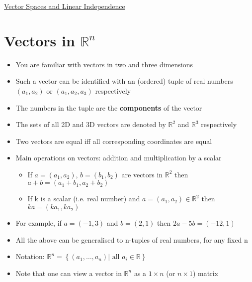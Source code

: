 \documentclass{article}[18pt]
\begin{document}
\begin{center}
\underline{\huge Vector Spaces and Linear Independence}
\end{center}
\section{Vectors in $\mathbb{R}^n$}
\begin{itemize}
	\item You are familiar with vectors in two and three dimensions
	\item Such a vector can be identified with an (ordered) tuple of real numbers $(a_1,a_2)$ or $(a_1,a_2,a_3)$ respectively
	\item The numbers in the tuple are the \textbf{components} of the vector
	\item The sets of all 2D and 3D vectors are denoted by $\mathbb{R}^2$ and $\mathbb{R}^3$ respectively
	\item Two vectors are equal iff all corresponding coordinates are equal 
	\item Main operations on vectors: addition and multiplication by a scalar
	\begin{itemize}
		\item If $a=(a_1,a_2)$, $b=(b_1,b_2)$ are vectors in $\mathbb{R}^2$ then $a+b=(a_1+b_1,a_2+b_2)$
		\item If k is a scalar (i.e. real number) and $a=(a_1,a_2)\in \mathbb{R}^2$ then $ka=(ka_1,ka_2)$
	\end{itemize}
	\item For example, if $a=(-1,3)$ and $b=(2,1)$ then $2a-5b=(-12,1)$
	\item All the above can be generalised to n-tuples of real numbers, for any fixed n
	\item Notation: $\mathbb { R } ^ { n } = \left\{ \left( a _ { 1 } , \dots , a _ { n } \right) | \text { all } a _ { i } \in \mathbb { R } \right\}$
	\item Note that one can view a vector in $\mathbb{R}^n$ as a $1\times n$ (or $n\times 1$) matrix
\end{itemize}
\end{document}
